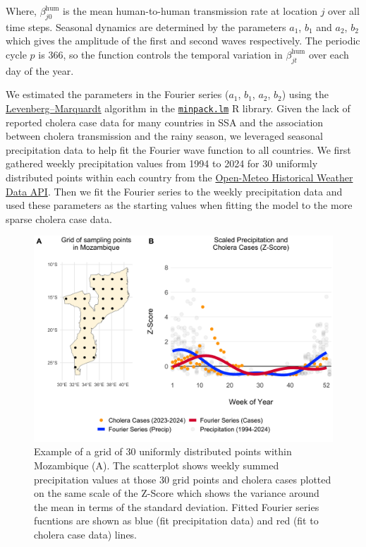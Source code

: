 \documentclass[
]{book}
\begin{document}
Where, \(\beta_{j0}^{\text{hum}}\) is the mean human-to-human transmission rate at location \(j\) over all time steps. Seasonal dynamics are determined by the parameters \(a_1\), \(b_1\) and \(a_2\), \(b_2\) which gives the amplitude of the first and second waves respectively. The periodic cycle \(p\) is 366, so the function controls the temporal variation in \(\beta_{jt}^{\text{hum}}\) over each day of the year.

We estimated the parameters in the Fourier series (\(a_1\), \(b_1\), \(a_2\), \(b_2\)) using the \href{https://en.wikipedia.org/wiki/Levenberg\%E2\%80\%93Marquardt_algorithm}{Levenberg--Marquardt} algorithm in the \href{https://rdrr.io/cran/minpack.lm/}{\texttt{minpack.lm}} R library. Given the lack of reported cholera case data for many countries in SSA and the association between cholera transmission and the rainy season, we leveraged seasonal precipitation data to help fit the Fourier wave function to all countries. We first gathered weekly precipitation values from 1994 to 2024 for 30 uniformly distributed points within each country from the \href{https://open-meteo.com/en/docs/historical-weather-api}{Open-Meteo Historical Weather Data API}. Then we fit the Fourier series to the weekly precipitation data and used these parameters as the starting values when fitting the model to the more sparse cholera case data.

\begin{figure}

{\centering \includegraphics[width=1\linewidth]{figures/seasonal_transmission_example_MOZ} 

}

\caption{Example of a grid of 30 uniformly distributed points within Mozambique (A). The scatterplot shows weekly summed precipitation values at those 30 grid points and cholera cases plotted on the same scale of the Z-Score which shows the variance around the mean in terms of the standard deviation. Fitted Fourier series fucntions are shown as blue (fit precipitation data) and red (fit to cholera case data) lines.}\label{fig:seasonal-example}
\end{figure}
\end{document}
